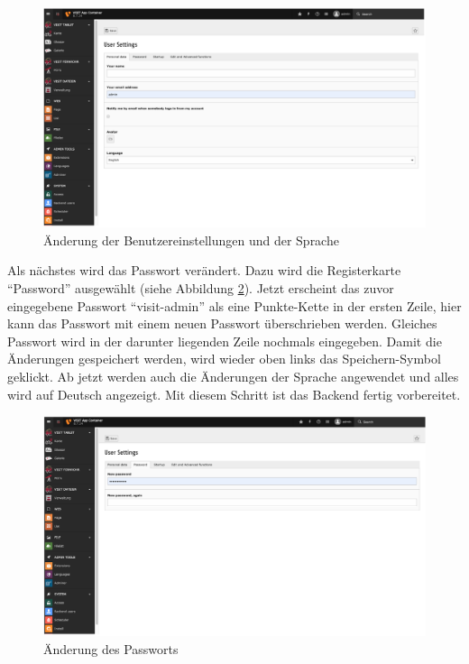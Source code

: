 \begin{figure}[ht!]
\centering
\includegraphics[width=12cm]{Figures/paula/benutzereinstellungen_sprache.png}
\caption{Änderung der Benutzereinstellungen und der Sprache}
\label{img:benutzereinstellungen_sprache}
\end{figure}

Als nächstes wird das Passwort verändert. Dazu wird die Registerkarte “Password” ausgewählt (siehe Abbildung \ref{img:aenderung_passwort}). Jetzt erscheint das zuvor eingegebene Passwort “visit-admin” als eine Punkte-Kette in der ersten Zeile, hier kann das Passwort mit einem neuen Passwort überschrieben werden. Gleiches Passwort wird in der darunter liegenden Zeile nochmals eingegeben. Damit die Änderungen gespeichert werden, wird wieder oben links das Speichern-Symbol geklickt. Ab jetzt werden auch die Änderungen der Sprache angewendet und alles wird auf Deutsch angezeigt. Mit diesem Schritt ist das Backend fertig vorbereitet.

\begin{figure}[ht!]
\centering
\includegraphics[width=12cm]{Figures/paula/aenderung_passwort.png}
\caption{Änderung des Passworts}
\label{img:aenderung_passwort}
\end{figure}

